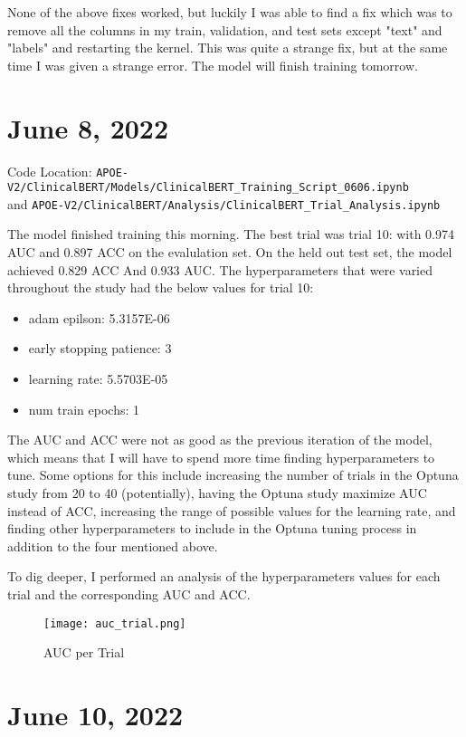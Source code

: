 \documentclass[11pt,letterpaper]{article}
\begin{document}
None of the above fixes worked, but luckily I was able to find a fix which was to remove all the columns in my train, validation, and test sets except "text" and "labels" and restarting the kernel. This was quite a strange fix, but at the same time I was given a strange error. The model will finish training tomorrow. 

\section{June 8, 2022}

Code Location: \texttt{APOE-V2/ClinicalBERT/Models/ClinicalBERT\_Training\_Script\_0606.ipynb} \\ and \texttt{APOE-V2/ClinicalBERT/Analysis/ClinicalBERT\_Trial\_Analysis.ipynb}

The model finished training this morning. The best trial was trial 10: with 0.974 AUC and 0.897 ACC on the evalulation set. On the held out test set, the model achieved 0.829 ACC And 0.933 AUC. The hyperparameters that were varied throughout the study had the below values for trial 10:

\begin{itemize}
\item adam epilson: 5.3157E-06
\item early stopping patience: 3
\item learning rate: 5.5703E-05
\item num train epochs: 1
\end{itemize}

The AUC and ACC were not as good as the previous iteration of the model, which means that I will have to spend more time finding hyperparameters to tune. Some options for this include increasing the number of trials in the Optuna study from 20 to 40 (potentially), having the Optuna study maximize AUC instead of ACC, increasing the range of possible values for the learning rate, and finding other hyperparameters to include in the Optuna tuning process in addition to the four mentioned above. 

To dig deeper, I performed an analysis of the hyperparameters values for each trial and the corresponding AUC and ACC. 

\begin{figure}[ht!]
\label{auc_trial_20}
\centering
\texttt{[image: auc\_trial.png]}
\caption{AUC per Trial}
\end{figure}

\section{June 10, 2022}
\end{document}

